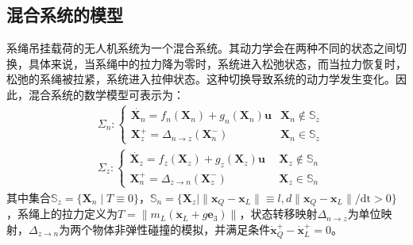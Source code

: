 \documentclass[lang=chs, degree=master, blindreview=false, winfonts=true]{yanputhesis}
\begin{document}
\subsection{混合系统的模型}
系绳吊挂载荷的无人机系统为一个混合系统。其动力学会在两种不同的状态之间切换，具体来说，当系绳中的拉力降为零时，系统进入松弛状态，而当拉力恢复时，松弛的系绳被拉紧，系统进入拉伸状态。这种切换导致系统的动力学发生变化。因此，混合系统的数学模型可表示为：
\begin{equation}
	\left.\begin{aligned}&\Sigma_{n}:\left\{\begin{array}{ll}\dot{\bm X_n}= f_n(\bm X_n)+ g_n(\bm X_n)\bm u  &\bm X_n\notin \mathbb{S}_z\\\bm X_z^+=\Delta_{n\to z}(\bm X_n^-)  &\bm X_n\in \mathbb{S}_z\end{array}\right.\\&\Sigma_{z}:\left\{\begin{array}{ll}\dot{\bm X_z}=f_z(\bm X_z) + g_z(\bm X_z)\bm u \ \ &\bm X_z\notin \mathbb{S}_n\\\bm X_n^+=\Delta_{z\to n}(\bm X_z^-) \ &\bm X_z\in \mathbb{S}_n\end{array}\right.\end{aligned}\right.
	\label{eq:混合模型}
\end{equation}
其中集合$\mathbb S_z = \{ \bm X_n \mid  T \equiv 0 \}$，$\mathbb S_n = \{ \bm X_z \mid \|\bm x_Q - \bm x_L\| \equiv l, d \|\bm x_Q - \bm x_L\| /\text{dt}> 0 \}$，系绳上的拉力定义为$ T = \|m_L (\ddot{\bm x}_L + g\bm{e}_3)\|$，状态转移映射$\Delta_{n\to z}$为单位映射，$\Delta_{z\to n}$为两个物体非弹性碰撞的模拟，并满足条件$\dot{\bm x}_Q^+-\dot{\bm x}_L^+=0$。
\end{document}
